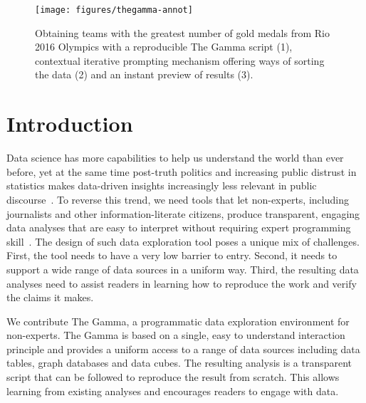 \documentclass[manuscript,review,anonymous]{acmart}
\begin{document}
\maketitle

\begin{figure}
\texttt{[image: figures/thegamma-annot]}
\vspace{-0.5em}
\caption{Obtaining teams with the greatest number of gold medals from Rio 2016
Olympics with a reproducible The Gamma script (1), contextual iterative prompting mechanism
offering ways of sorting the data (2) and an instant preview of results (3).}
\label{fig:thegamma}
\vspace{-0.5em}
\end{figure}


\section{Introduction}
Data science has more capabilities to help us understand the world than ever before, yet at the
same time post-truth politics and increasing public distrust in statistics makes data-driven insights
increasingly less relevant in public discourse~\cite{howstatslost}. To reverse this trend, we
need tools that let non-experts, including journalists and other information-literate citizens,
produce transparent, engaging data analyses that are easy to interpret without requiring expert
programming skill~\cite{ddj}. The design of such data exploration tool poses a unique mix of challenges.
First, the tool needs to have a very low barrier to entry. Second, it needs to support a wide
range of data sources in a uniform way. Third, the resulting data analyses need to assist
readers in learning how to reproduce the work and verify the claims it makes.

We contribute The Gamma, a programmatic data exploration environment for non-experts. The Gamma
is based on a single, easy to understand interaction principle and provides a uniform
access to a range of data sources including data tables, graph databases and data cubes.
The resulting analysis is a transparent script that can be followed to reproduce the
result from scratch. This allows learning from existing analyses and encourages readers
to engage with data.
\end{document}
